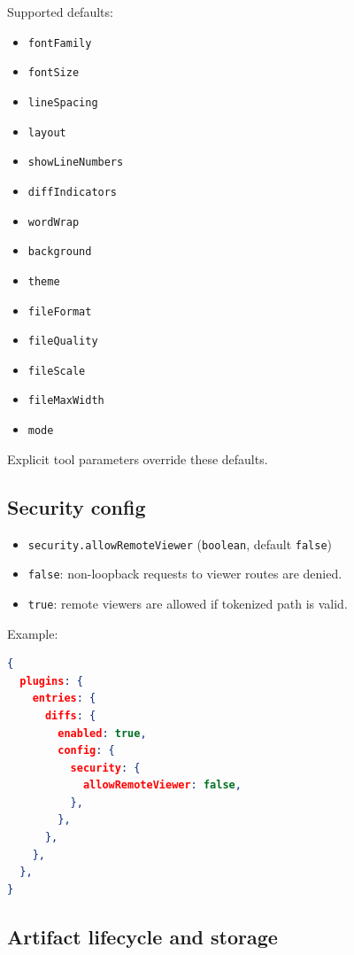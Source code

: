 Supported defaults:

\begin{itemize}
  \item \texttt{fontFamily}
  \item \texttt{fontSize}
  \item \texttt{lineSpacing}
  \item \texttt{layout}
  \item \texttt{showLineNumbers}
  \item \texttt{diffIndicators}
  \item \texttt{wordWrap}
  \item \texttt{background}
  \item \texttt{theme}
  \item \texttt{fileFormat}
  \item \texttt{fileQuality}
  \item \texttt{fileScale}
  \item \texttt{fileMaxWidth}
  \item \texttt{mode}
\end{itemize}


Explicit tool parameters override these defaults.

\subsection{Security config}


\begin{itemize}
  \item \texttt{security.allowRemoteViewer} (\texttt{boolean}, default \texttt{false})
  \item \texttt{false}: non-loopback requests to viewer routes are denied.
  \item \texttt{true}: remote viewers are allowed if tokenized path is valid.
\end{itemize}


Example:

\begin{lstlisting}[language=json]
{
  plugins: {
    entries: {
      diffs: {
        enabled: true,
        config: {
          security: {
            allowRemoteViewer: false,
          },
        },
      },
    },
  },
}
\end{lstlisting}


\subsection{Artifact lifecycle and storage}


